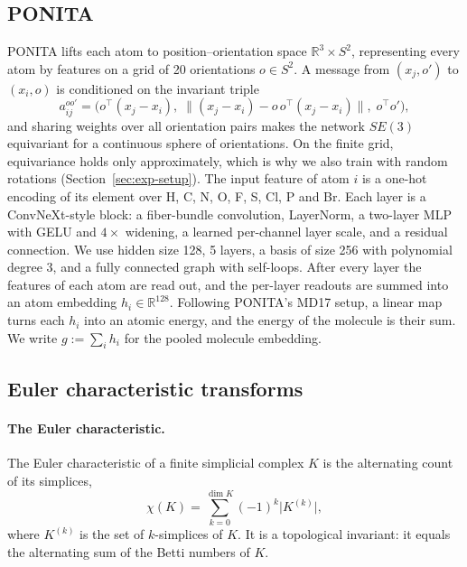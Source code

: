 \documentclass{article}
\newcommand{\R}{\mathbb{R}}
\begin{document}
\subsection{PONITA}
\label{sec:ponita}
PONITA \citep{bekkers2024ponita} lifts each atom to position--orientation space $\R^3\times S^2$, representing every atom by features on a grid of 20 orientations $o\in S^2$. A message from $(x_j,o')$ to $(x_i,o)$ is conditioned on the invariant triple
\begin{equation}
  a_{ij}^{oo'} = \Big( o^\top (x_j - x_i),\; \big\| (x_j - x_i) - o\,o^\top (x_j - x_i) \big\|,\; o^\top o' \Big),
  \label{eq:ponita-invariants}
\end{equation}
and sharing weights over all orientation pairs makes the network $SE(3)$ equivariant for a continuous sphere of orientations. On the finite grid, equivariance holds only approximately, which is why we also train with random rotations (Section~\ref{sec:exp-setup}). The input feature of atom $i$ is a one-hot encoding of its element over H, C, N, O, F, S, Cl, P and Br. Each layer is a ConvNeXt-style block: a fiber-bundle convolution, LayerNorm, a two-layer MLP with GELU and $4\times$ widening, a learned per-channel layer scale, and a residual connection. We use hidden size 128, 5 layers, a basis of size 256 with polynomial degree 3, and a fully connected graph with self-loops. After every layer the features of each atom are read out, and the per-layer readouts are summed into an atom embedding $h_i\in\R^{128}$. Following PONITA's MD17 setup, a linear map turns each $h_i$ into an atomic energy, and the energy of the molecule is their sum. We write $g := \sum_i h_i$ for the pooled molecule embedding.

\subsection{Euler characteristic transforms}

\paragraph{The Euler characteristic.}
The Euler characteristic of a finite simplicial complex $K$ is the alternating count of its simplices,
\begin{equation}
  \chi(K) = \sum_{k=0}^{\dim K} (-1)^k \big| K^{(k)} \big|,
  \label{eq:euler}
\end{equation}
where $K^{(k)}$ is the set of $k$-simplices of $K$. It is a topological invariant: it equals the alternating sum of the Betti numbers of $K$.
\end{document}
